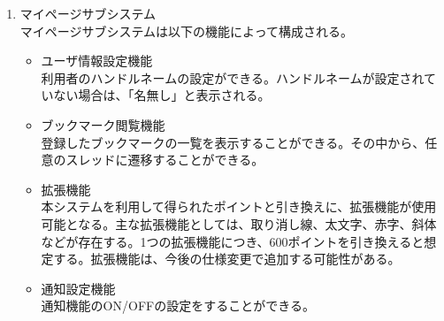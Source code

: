 \documentclass[a4j]{jarticle}
\begin{document}
\begin{enumerate}
  \item マイページサブシステム\\
  マイページサブシステムは以下の機能によって構成される。
  \begin{itemize}
    \item ユーザ情報設定機能\\
    利用者のハンドルネームの設定ができる。ハンドルネームが設定されていない場合は、「名無し」と表示される。
    \item ブックマーク閲覧機能\\
    登録したブックマークの一覧を表示することができる。その中から、任意のスレッドに遷移することができる。
    \item 拡張機能\\
    本システムを利用して得られたポイントと引き換えに、拡張機能が使用可能となる。主な拡張機能としては、取り消し線、太文字、赤字、斜体などが存在する。1つの拡張機能につき、600ポイントを引き換えると想定する。拡張機能は、今後の仕様変更で追加する可能性がある。
    \item 通知設定機能\\
    通知機能のON/OFFの設定をすることができる。
  \end{itemize}
\end{enumerate}
\end{document}
